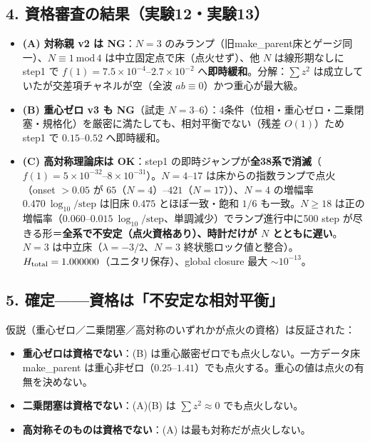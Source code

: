 \documentclass[
  a4paper,
]{ltjsarticle}
\providecommand{\tightlist}{%
  \setlength{\itemsep}{0pt}\setlength{\parskip}{0pt}}
\begin{document}
\subsection{4.
資格審査の結果（実験12・実験13）}\label{ux8cc7ux683cux5be9ux67fbux306eux7d50ux679cux5b9fux9a1312ux5b9fux9a1313}

\begin{itemize}
\tightlist
\item
  \textbf{(A) 対称親 v2 は NG}：\(N=3\)
  のみランプ（旧make\_parent床とゲージ同一）、\(N\equiv1\ \mathrm{mod}\,4\)
  は中立固定点で床（点火せず）、他 \(N\) は線形期なしに step1 で
  \(f(1)=7.5\times10^{-4}\)--\(2.7\times10^{-2}\)
  へ\textbf{即時緩和}。分解：\(\sum z^2\)
  は成立していたが交差項チャネルが空（全波
  \(ab\equiv0\)）かつ重心が最大級。
\item
  \textbf{(B) 重心ゼロ v3 も NG}（試走
  \(N=3\)--\(6\)）：4条件（位相・重心ゼロ・二乗閉塞・規格化）を厳密に満たしても、相対平衡でない（残差
  \(O(1)\)）ため step1 で \(0.15\)--\(0.52\) へ即時緩和。
\item
  \textbf{(C) 高対称理論床は OK}：step1
  の即時ジャンプが\textbf{全38系で消滅}（\(f(1)=5\times10^{-32}\)--\(8\times10^{-31}\)）。\(N=4\)--\(17\)
  は床からの指数ランプで点火（onset \(>0.05\) が
  \(65\)（\(N=4\)）--\(421\)（\(N=17\)））、\(N=4\) の増幅率
  \(0.470\ \log_{10}/\text{step}\) は旧床 \(0.475\) とほぼ一致・飽和
  \(1/6\) も一致。\(N\ge18\)
  は正の増幅率（\(0.060\)--\(0.015\ \log_{10}/\text{step}\)、単調減少）でランプ進行中に500
  step が尽きる形＝\textbf{全系で不安定（点火資格あり）、時計だけが
  \(N\) とともに遅い}。\(N=3\) は中立床（\(\lambda=-3/2\)、\(N=3\)
  終状態ロック値と整合）。\(H_{\rm total}=1.000000\)（ユニタリ保存）、global
  closure 最大 \(\sim10^{-13}\)。
\end{itemize}

\subsection{5.
確定------資格は「不安定な相対平衡」}\label{ux78baux5b9aux8cc7ux683cux306fux4e0dux5b89ux5b9aux306aux76f8ux5bfeux5e73ux8861}

仮説（重心ゼロ／二乗閉塞／高対称のいずれかが点火の資格）は反証された：

\begin{itemize}
\tightlist
\item
  \textbf{重心ゼロは資格でない}：(B)
  は重心厳密ゼロでも点火しない。一方データ床 make\_parent
  は重心非ゼロ（\(0.25\)--\(1.41\)）でも点火する。重心の値は点火の有無を決めない。
\item
  \textbf{二乗閉塞は資格でない}：(A)(B) は \(\sum z^2\approx0\)
  でも点火しない。
\item
  \textbf{高対称そのものは資格でない}：(A) は最も対称だが点火しない。
\end{itemize}
\end{document}
